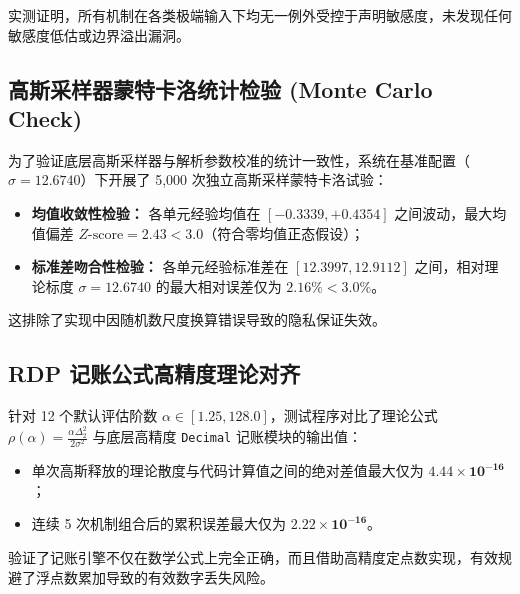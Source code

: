 \begin{table}[htbp]
\centering
\small
\caption{五大统计指标相邻数据集经验敏感度实测验证表}
\label{tab:sensitivity_verification}
\end{table}

实测证明，所有机制在各类极端输入下均无一例外受控于声明敏感度，未发现任何敏感度低估或边界溢出漏洞。

\subsection{高斯采样器蒙特卡洛统计检验 (Monte Carlo Check)}
为了验证底层高斯采样器与解析参数校准的统计一致性，系统在基准配置（$\sigma = 12.6740$）下开展了 5,000 次独立高斯采样蒙特卡洛试验：
\begin{itemize}[leftmargin=2em]
  \item \textbf{均值收敛性检验：} 各单元经验均值在 $[-0.3339, +0.4354]$ 之间波动，最大均值偏差 $Z\text{-score} = 2.43 < 3.0$（符合零均值正态假设）；
  \item \textbf{标准差吻合性检验：} 各单元经验标准差在 $[12.3997, 12.9112]$ 之间，相对理论标度 $\sigma = 12.6740$ 的最大相对误差仅为 $\mathbf{2.16\% < 3.0\%}$。
\end{itemize}
这排除了实现中因随机数尺度换算错误导致的隐私保证失效。

\subsection{RDP 记账公式高精度理论对齐}
针对 12 个默认评估阶数 $\alpha \in [1.25, 128.0]$，测试程序对比了理论公式 $\rho(\alpha) = \frac{\alpha \Delta_2^2}{2\sigma^2}$ 与底层高精度 \texttt{Decimal} 记账模块的输出值：
\begin{itemize}[leftmargin=2em]
  \item 单次高斯释放的理论散度与代码计算值之间的绝对差值最大仅为 $\mathbf{4.44 \times 10^{-16}}$；
  \item 连续 5 次机制组合后的累积误差最大仅为 $\mathbf{2.22 \times 10^{-16}}$。
\end{itemize}
验证了记账引擎不仅在数学公式上完全正确，而且借助高精度定点数实现，有效规避了浮点数累加导致的有效数字丢失风险。

